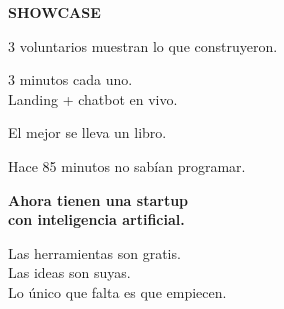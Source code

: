 \documentclass[aspectratio=169]{beamer}
\begin{document}
\begin{frame}[plain]
\begin{center}
\vspace{2.5cm}
{\fontsize{36}{40}\selectfont\bfseries\color{accent} SHOWCASE}

\vspace{0.8cm}
{\fontsize{18}{22}\selectfont\color{textwhite} 3 voluntarios muestran lo que construyeron.}

\vspace{0.5cm}
{\fontsize{16}{20}\selectfont\color{textgray} 3 minutos cada uno.\\Landing + chatbot en vivo.}

\vspace{1cm}
{\fontsize{16}{20}\selectfont\color{warning} El mejor se lleva un libro.}
\end{center}
\end{frame}

\begin{frame}[plain]
\begin{center}
\vspace{1.5cm}
{\fontsize{22}{26}\selectfont\color{textgray} Hace 85 minutos no sab\'ian programar.}

\vspace{0.6cm}
{\fontsize{28}{32}\selectfont\color{textwhite}\bfseries Ahora tienen una startup\\[8pt] con inteligencia artificial.}

\vspace{1cm}
{\fontsize{18}{22}\selectfont\color{accent} Las herramientas son gratis.\\[6pt] Las ideas son suyas.\\[6pt] Lo \'unico que falta es que empiecen.}
\end{center}
\end{frame}
\end{document}
